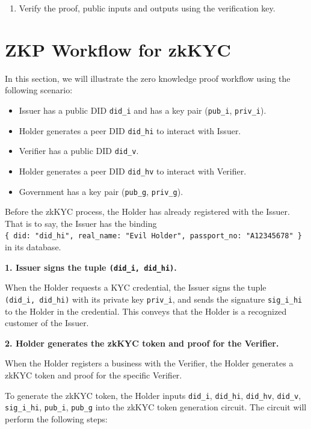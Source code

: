 \documentclass[
]{report}
\providecommand{\tightlist}{%
  \setlength{\itemsep}{0pt}\setlength{\parskip}{0pt}}
\begin{document}
\begin{enumerate}
\def\labelenumi{\arabic{enumi}.}
\tightlist
\item
  Verify the proof, public inputs and outputs using the verification
  key.
\end{enumerate}

\section{ZKP Workflow for zkKYC}

In this section, we will illustrate the zero knowledge proof workflow
using the following scenario:

\begin{itemize}
\tightlist
\item
  Issuer has a public DID \texttt{did\_i} and has a key pair
  (\texttt{pub\_i}, \texttt{priv\_i}).
\item
  Holder generates a peer DID \texttt{did\_hi} to interact with Issuer.
\item
  Verifier has a public DID \texttt{did\_v}.
\item
  Holder generates a peer DID \texttt{did\_hv} to interact with
  Verifier.
\item
  Government has a key pair (\texttt{pub\_g}, \texttt{priv\_g}).
\end{itemize}

Before the zkKYC process, the Holder has already registered with the
Issuer. That is to say, the Issuer has the binding
\texttt{\{\ did:\ "did\_hi",\ real\_name:\ "Evil\ Holder",\ passport\_no:\ "A12345678"\ \}}
in its database.

\textbf{1. Issuer signs the tuple \texttt{(did\_i,\ did\_hi)}.}

When the Holder requests a KYC credential, the Issuer signs the tuple
\texttt{(did\_i,\ did\_hi)} with its private key \texttt{priv\_i}, and
sends the signature \texttt{sig\_i\_hi} to the Holder in the credential.
This conveys that the Holder is a recognized customer of the Issuer.

\textbf{2. Holder generates the zkKYC token and proof for the Verifier.}

When the Holder registers a business with the Verifier, the Holder
generates a zkKYC token and proof for the specific Verifier.

To generate the zkKYC token, the Holder inputs \texttt{did\_i},
\texttt{did\_hi}, \texttt{did\_hv}, \texttt{did\_v},
\texttt{sig\_i\_hi}, \texttt{pub\_i}, \texttt{pub\_g} into the zkKYC
token generation circuit. The circuit will perform the following
steps:
\end{document}
